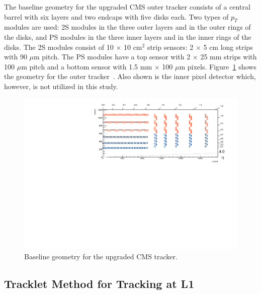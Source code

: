\documentclass{PoS}
\begin{document}
The baseline geometry for the upgraded CMS outer tracker consists of a central barrel with six layers and two endcaps with five disks each. Two types of $p_T$ modules are used: 2S modules in the three outer layers and in the outer rings of the disks, and PS modules in the three inner layers and in the inner rings of the disks. The 2S modules consist of 10 $\times$ 10 cm$^2$ strip sensors: 2 $\times$ 5 cm long strips with 90 $\mu$m pitch. The PS modules have a top sensor with 2 $\times$ 25 mm strips with 100 $\mu$m pitch and a bottom sensor with 1.5 mm $\times$ 100 $\mu$m pixels. Figure~\ref{fig:TrackerLayout} shows the geometry for the outer tracker~\cite{TkLayout}. Also shown is the inner pixel detector which, however, is not utilized in this study.
\begin{figure}[h!]
  \centering
	\includegraphics[width=\textwidth]{Figures/TrackerLayout.pdf}
	\caption{Baseline geometry for the upgraded CMS tracker.}
	\label{fig:TrackerLayout}
\end{figure}

\subsection{Tracklet Method for Tracking at L1}
\end{document}
